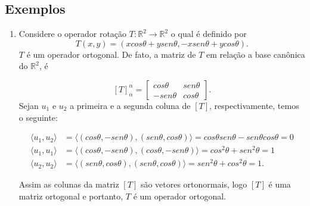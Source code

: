 




\subsection{Exemplos}

\begin{enumerate}
\item Considere o operador rotação $ T: \mathbb{R}^2 \rightarrow \mathbb{R}^2 $  o qual é  definido por $$T(x,y)=(xcos\theta + y sen\theta, -xsen\theta+ycos\theta). $$
$T$ é um operador ortogonal. De fato,  a matriz de $T$ em relação a base canônica do $\mathbb{R}^2$, é

$$[T]_{\alpha}^{\alpha}=\left[ \begin{array}{cc}cos\theta &sen\theta \\-sen\theta & cos\theta   \end{array} \right].$$ Sejan $u_1$ e $u_2$ a primeira e a segunda coluna de $[T]$, respectivamente, temos o seguinte:

\begin{align*}
\langle u_1, u_2\rangle&=  \langle (cos\theta, -sen\theta), (sen\theta, cos\theta )\rangle= cos\theta sen\theta - sen\theta cos\theta = 0\\
\langle u_1, u_1\rangle&=  \langle (cos\theta, -sen\theta), (cos\theta, -sen\theta )\rangle= cos^2\theta+ sen^2\theta=1\\
\langle u_2, u_2\rangle&=  \langle (sen\theta, cos\theta), (sen\theta, cos\theta )\rangle= sen^2\theta+ cos^2\theta=1.
\end{align*}

Assim  as colunas da matriz $[T]$ são vetores ortonormais, logo $[T]$ é uma matriz ortogonal e  portanto,  $T$ é um operador ortogonal.

\end{enumerate}

